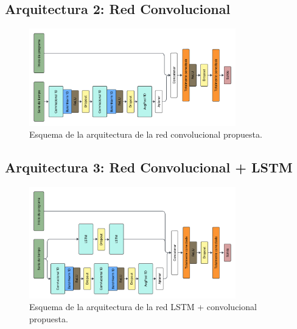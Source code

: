 \documentclass[../../main.tex]{subfiles}
\begin{document}
\subsection{Arquitectura 2: Red Convolucional}
\begin{figure}[H]
    \centering
    \includegraphics[width=0.8\textwidth]{figs/conv.png}
    \caption{Esquema de la arquitectura de la red convolucional propuesta.}
    \label{fig:conv}
\end{figure}


\subsection{Arquitectura 3: Red Convolucional + LSTM}
\begin{figure}[H]
    \centering
    \includegraphics[width=0.8\textwidth]{figs/lstm_conv.png}
    \caption{Esquema de la arquitectura de la red LSTM + convolucional propuesta.}
    \label{fig:lstm_v2_conv}
\end{figure}
\end{document}
